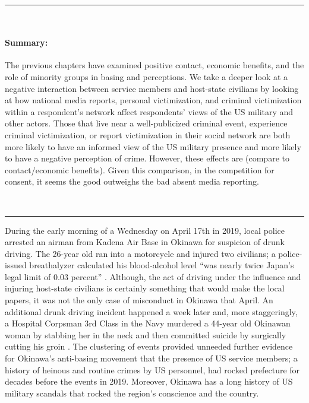 


\vspace*{-0.5cm}
\rule{\linewidth}{0.10pt} \\[-1cm]
{\footnotesize\paragraph{Summary:}  The previous chapters have examined positive contact, economic benefits, and the role of minority groups in basing and perceptions. We take a deeper look at a negative interaction between service members and host-state civilians by looking at how national media reports, personal victimization, and criminal victimization within a respondent's network affect respondents' views of the US military and other actors. Those that live near a well-publicized criminal event, experience criminal victimization, or report victimization in their social network are both more likely to have an informed view of the US military presence and more likely to have a negative perception of crime. However, these effects are (compare to contact/economic benefits). Given this comparison, in the competition for consent, it seems the good outweighs the bad absent media reporting.} 
\\[-0.5cm] 
\rule{\linewidth}{0.10pt}

\vspace*{0.5cm}



During the early morning of a Wednesday on April 17th in 2019, local police arrested an airman from Kadena Air Base in Okinawa for suspicion of drunk driving. The 26-year old ran into a motorcycle and injured two civilians; a police-issued breathalyzer calculated his blood-alcohol level ``was nearly twice Japan's legal limit of 0.03 percent'' \cite{Burke2019}. Although, the act of driving under the influence and injuring host-state civilians is certainly something that would make the local papers, it was not the only case of misconduct in Okinawa that April. An additional drunk driving incident happened a week later and, more staggeringly, a Hospital Corpsman 3rd Class in the Navy murdered a 44-year old Okinawan woman by stabbing her in the neck and then committed suicide by surgically cutting his groin \cite{Simkins2109}. The clustering of events provided unneeded further evidence for Okinawa's anti-basing movement that the presence of US service members; a history of heinous and routine crimes by US personnel, had rocked prefecture for decades before the events in 2019. Moreover, Okinawa has a long history of US military scandals that rocked the region's conscience and the country.

